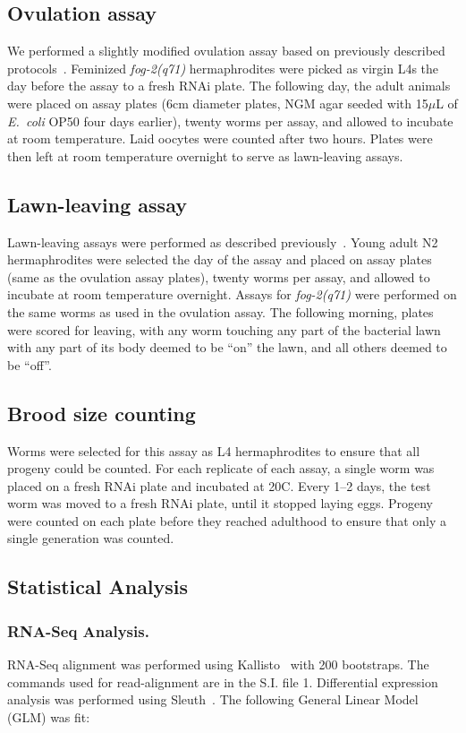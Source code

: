 \documentclass[10pt,letterpaper,twocolumn]{article}
\newcommand{\fog}{\emph{\mbox{fog-2}}}
\newcommand{\ecol}{\emph{E.~coli}}
\begin{document}
\subsection*{Ovulation assay}
\label{sb:oocyte_assay}
We performed a slightly modified ovulation assay based on previously described protocols~\cite{White2012}. Feminized \fog{}\emph{(q71)} hermaphrodites were picked as virgin L4s the day before the assay to a fresh RNAi plate. The following day, the adult animals were placed on assay plates (6cm diameter plates, NGM agar seeded with 15$\mu$L of \ecol{} OP50 four days earlier), twenty worms per assay, and allowed to incubate at room temperature. Laid oocytes were counted after two hours. Plates were then left at room temperature overnight to serve as lawn-leaving assays.

\subsection*{Lawn-leaving assay}
\label{sb:lawn_leaving}
Lawn-leaving assays were performed as described previously~\cite{Lipton2004}. Young adult N2 hermaphrodites were selected the day of the assay and placed on assay plates (same as the ovulation assay plates), twenty worms per assay, and allowed to incubate at room temperature overnight. Assays for \fog{}\emph{(q71)} were performed on the same worms as used in the ovulation assay. The following morning, plates were scored for leaving, with any worm touching any part of the bacterial lawn with any part of its body deemed to be “on” the lawn, and all others deemed to be “off”.

\subsection*{Brood size counting}
\label{sb:brood_size}
Worms were selected for this assay as L4 hermaphrodites to ensure that all progeny could be counted. For each replicate of each assay, a single worm was placed on a fresh RNAi plate and incubated at 20\degree{}C. Every 1--2 days, the test worm was moved to a fresh RNAi plate, until it stopped laying eggs. Progeny were counted on each plate before they reached adulthood to ensure that only a single generation was counted.

\subsection*{Statistical Analysis}
\label{sb:statistics}
\subsubsection*{RNA-Seq Analysis.}
\label{sb:model}
RNA-Seq alignment was performed using Kallisto~\cite{Bray2016} with 200 bootstraps. The commands used for read-alignment are in the S.I. file 1. Differential expression analysis was performed using Sleuth~\cite{Pimentel2016}. The following General Linear Model (GLM) was fit:
\end{document}
